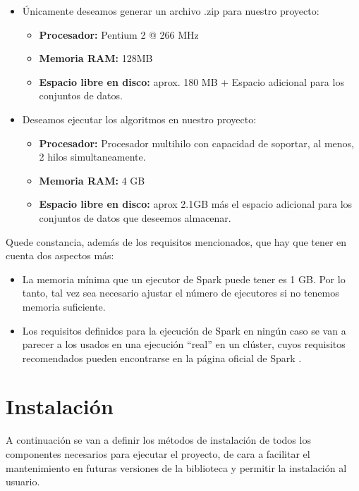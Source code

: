 \begin{itemize}
\item Únicamente deseamos generar un archivo .zip para nuestro proyecto:
	\begin{itemize}
	\item \textbf{Procesador:} Pentium 2 @ 266 MHz \cite{minRequerimentsJava}
	\item \textbf{Memoria RAM:} 128MB \cite{minRequerimentsJava}
	\item \textbf{Espacio libre en disco:} aprox. 180 MB + Espacio adicional para los conjuntos de datos.
	\end{itemize}
\item Deseamos ejecutar los algoritmos en nuestro proyecto:
	\begin{itemize}
	\item \textbf{Procesador:} Procesador multihilo con capacidad de soportar, al menos, 2 hilos simultaneamente.
	\item \textbf{Memoria RAM:} 4 GB
	\item \textbf{Espacio libre en disco:} aprox 2.1GB más el espacio adicional para los conjuntos de datos que deseemos almacenar.
	\end{itemize}
\end{itemize}

Quede constancia, además de los requisitos mencionados, que hay que tener en cuenta dos aspectos más:
\begin{itemize}
\item La memoria mínima que un ejecutor de Spark puede tener es 1 GB. Por lo tanto, tal vez sea necesario ajustar el número de ejecutores si no tenemos memoria suficiente.
\item Los requisitos definidos para la ejecución de Spark en ningún caso se van a parecer a los usados en una ejecución ``real'' en un clúster, cuyos requisitos recomendados pueden encontrarse en la página oficial de Spark \cite{requisitosSpark}.
\end{itemize}


\section{Instalación}\label{sec:Instalacion}

A continuación se van a definir los métodos de instalación de todos los componentes necesarios para ejecutar el proyecto, de cara a facilitar el mantenimiento en futuras versiones de la biblioteca y permitir la instalación al usuario.

